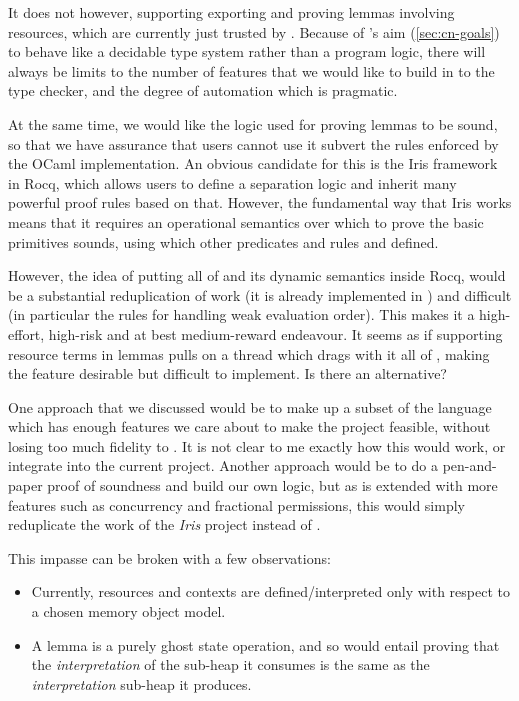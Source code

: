 It does not however, supporting exporting and proving lemmas involving
resources, which are currently just trusted by . Because of 's
aim (\cref{sec:cn-goals}) to behave like a decidable type system rather than a
program logic, there will always be limits to the number of features that we
would like to build in to the type checker, and the degree of automation which
is pragmatic.

At the same time, we would like the logic used for proving lemmas to be sound,
so that we have assurance that users cannot use it subvert the rules enforced
by the OCaml implementation. An obvious candidate for this is the
Iris framework in Rocq, which allows users to define a
separation logic and inherit many powerful proof rules based on that. However,
the fundamental way that Iris works means that it requires an operational
semantics over which to prove the basic primitives sounds, using which other
predicates and rules and defined.

However, the idea of putting all of  and its dynamic semantics inside
Rocq, would be a substantial reduplication of work (it is already
implemented in ) and difficult (in particular the rules for
handling weak evaluation order). This makes it a high-effort, high-risk and at
best medium-reward endeavour. It seems as if supporting resource terms in
lemmas pulls on a thread which drags with it all of , making the
feature desirable but difficult to implement. Is there an alternative?

One approach that we discussed would be to make up a subset of the language
which has enough features we care about to make the project feasible, without
losing too much fidelity to . It is not clear to me exactly how this
would work, or integrate into the current project. Another approach would be to
do a pen-and-paper proof of soundness and build our own logic, but as 
is extended with more features such as concurrency and fractional permissions,
this would simply reduplicate the work of the \emph{Iris} project instead of
.

This impasse can be broken with a few observations:
\begin{itemize}
    \item Currently, resources and contexts are defined/interpreted only with
        respect to a chosen memory object model.
    \item A lemma is a purely ghost state operation, and so would entail
        proving that the \emph{interpretation} of the sub-heap it consumes is
        the same as the \emph{interpretation} sub-heap it produces.
\end{itemize}

